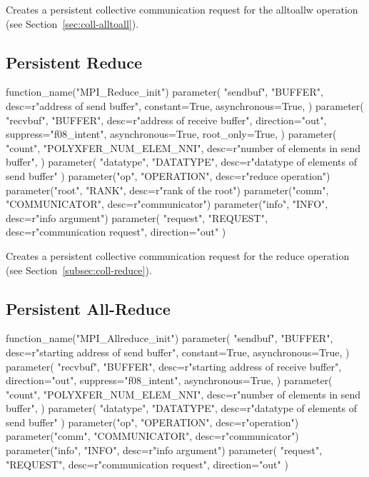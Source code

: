 Creates a persistent collective communication request for the alltoallw operation
(see Section~\ref{sec:coll-alltoall}).

\subsection{Persistent Reduce}
\label{subsec:pcoll-reduce}

%
\begin{mpi-binding}
    function_name("MPI_Reduce_init")
    parameter(
        "sendbuf",
        "BUFFER",
        desc=r"address of send buffer",
        constant=True,
        asynchronous=True,
    )
    parameter(
        "recvbuf",
        "BUFFER",
        desc=r"address of receive buffer",
        direction="out",
        suppress="f08_intent",
        asynchronous=True,
        root_only=True,
    )
    parameter(
        "count",
        "POLYXFER_NUM_ELEM_NNI",
        desc=r"number of elements in send buffer",
    )
    parameter(
        "datatype", "DATATYPE", desc=r"datatype of elements of send buffer"
    )
    parameter("op", "OPERATION", desc=r"reduce operation")
    parameter("root", "RANK", desc=r"rank of the root")
    parameter("comm", "COMMUNICATOR", desc=r"communicator")
    parameter("info", "INFO", desc=r"info argument")
    parameter(
        "request", "REQUEST", desc=r"communication request", direction="out"
    )
\end{mpi-binding}

Creates a persistent collective communication request for the reduce operation
(see Section~\ref{subsec:coll-reduce}).

\subsection{Persistent All-Reduce}
\label{subsec:pcoll-all-reduce}

%
\begin{mpi-binding}
    function_name("MPI_Allreduce_init")
    parameter(
        "sendbuf",
        "BUFFER",
        desc=r"starting address of send buffer",
        constant=True,
        asynchronous=True,
    )
    parameter(
        "recvbuf",
        "BUFFER",
        desc=r"starting address of receive buffer",
        direction="out",
        suppress="f08_intent",
        asynchronous=True,
    )
    parameter(
        "count",
        "POLYXFER_NUM_ELEM_NNI",
        desc=r"number of elements in send buffer",
    )
    parameter(
        "datatype", "DATATYPE", desc=r"datatype of elements of send buffer"
    )
    parameter("op", "OPERATION", desc=r"operation")
    parameter("comm", "COMMUNICATOR", desc=r"communicator")
    parameter("info", "INFO", desc=r"info argument")
    parameter(
        "request", "REQUEST", desc=r"communication request", direction="out"
    )
\end{mpi-binding}

